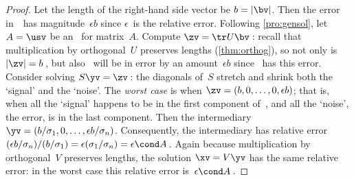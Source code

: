 \begin{proof} 
Let the length of the right-hand side vector be \(b=|\bv|\).
Then the error in~\bv\ has magnitude~\(\epsilon b\) since \(\epsilon\)~is the relative error.
Following \cref{pro:gensol},
let \(A=\usv\) be an \svd\ for matrix~\(A\).
Compute \(\zv=\tr U\bv\)\,: recall that multiplication by orthogonal~\(U\) preserves lengths (\cref{thm:orthog}), so not only is \(|\zv|=b\)\,, but also \zv~will be in error by an amount~\(\epsilon b\) since \bv~has this error. 
Consider solving \(S\yv=\zv\)\,: the diagonals of~\(S\) stretch and shrink both the `signal' and the `noise'.
The \emph{worst case} is when \(\zv=(b,0,\ldots,0,\epsilon b)\); that is, when all the `signal' happens to be in the first component of~\zv, and all the `noise', the error, is in the last component.
Then the intermediary \(\yv=(b/\sigma_1,0,\ldots,\epsilon b/\sigma_n)\).
Consequently, the intermediary has relative error \((\epsilon b/\sigma_n)/(b/\sigma_1)=\epsilon(\sigma_1/\sigma_n)=\epsilon\cond A \)\,.
Again because multiplication by orthogonal~\(V\) preserves lengths, the solution \(\xv=V\yv\) has the same relative error:  in the worst case this relative error is~\(\epsilon\cond A\)\,.
\end{proof}

